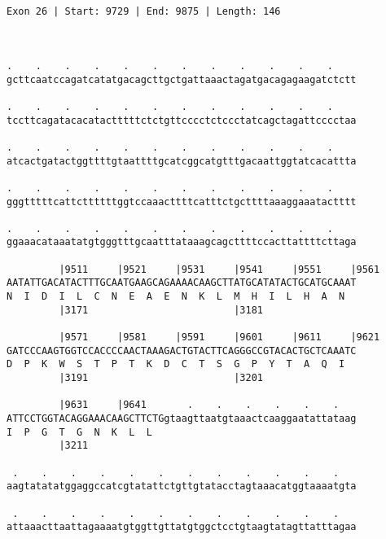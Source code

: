 \documentclass{article}
\begin{document}
\begin{Verbatim}
     
 
Exon 26 | Start: 9729 | End: 9875 | Length: 146



.    .    .    .    .    .    .    .    .    .    .    .    
gcttcaatccagatcatatgacagcttgctgattaaactagatgacagagaagatctctt
                                                            
.    .    .    .    .    .    .    .    .    .    .    .    
tccttcagatacacatactttttctctgttcccctctccctatcagctagattcccctaa
                                                            
.    .    .    .    .    .    .    .    .    .    .    .    
atcactgatactggttttgtaattttgcatcggcatgtttgacaattggtatcacattta
                                                            
.    .    .    .    .    .    .    .    .    .    .    .    
gggtttttcattcttttttggtccaaacttttcatttctgcttttaaaggaaatactttt
                                                            
.    .    .    .    .    .    .    .    .    .    .    .    
ggaaacataaatatgtgggtttgcaatttataaagcagcttttccacttattttcttaga
                                                            
         |9511     |9521     |9531     |9541     |9551     |9561
AATATTGACATACTTTGCAATGAAGCAGAAAACAAGCTTATGCATATACTGCATGCAAAT
N  I  D  I  L  C  N  E  A  E  N  K  L  M  H  I  L  H  A  N  
         |3171                         |3181                
  
         |9571     |9581     |9591     |9601     |9611     |9621
GATCCCAAGTGGTCCACCCCAACTAAAGACTGTACTTCAGGGCCGTACACTGCTCAAATC
D  P  K  W  S  T  P  T  K  D  C  T  S  G  P  Y  T  A  Q  I  
         |3191                         |3201                
  
         |9631     |9641       .    .    .    .    .    .   
ATTCCTGGTACAGGAAACAAGCTTCTGgtaagttaatgtaaactcaaggaatattataag
I  P  G  T  G  N  K  L  L                                   
         |3211                                              
  
 .    .    .    .    .    .    .    .    .    .    .    .   
aagtatatatggaggccatcgtatattctgttgtatacctagtaaacatggtaaaatgta
                                                            
 .    .    .    .    .    .    .    .    .    .    .    .   
attaaacttaattagaaaatgtggttgttatgtggctcctgtaagtatagttatttagaa
                                                            

\end{Verbatim}
\end{document}
